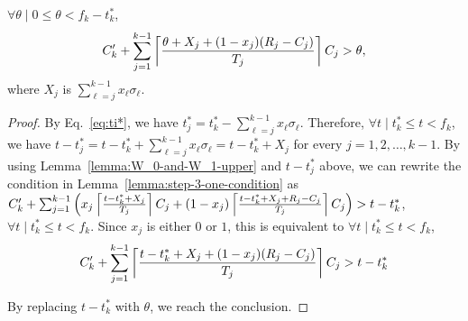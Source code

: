\begin{Lemma}
\label{lemma:step-3-ceiling-condition}
$\forall \theta \mid 0 \leq \theta < f_k-t_k^*$,
\begin{equation}
\label{eq:exec_plus_idle-almost-final-before-replacing-sigma} 
C_k'+\sum_{j=1}^{k-1} \ceiling{\frac{\theta+X_j+(1-x_j)(R_j-C_j)}{T_j}} C_j > \theta,
\end{equation}
where $X_j$ is $\sum_{\ell=j}^{k-1} x_\ell\sigma_\ell$. 
\end{Lemma}
\begin{proof}
  By Eq.~\eqref{eq:ti*}, we have $t_j^* = t_k^* - \sum_{\ell=j}^{k-1}
  x_\ell\sigma_\ell$. Therefore, $\forall t \mid t_k^* \leq t < f_k$,
  we have $t-t_j^* = t - t_k^* + \sum_{\ell=j}^{k-1}
  x_\ell\sigma_\ell = t-t_k^* + X_j$ for every $j=1,2,\ldots,k-1$. 
By using Lemma~\ref{lemma:W_0-and-W_1-upper} and $t-t_j^*$ above, we can rewrite the condition in Lemma~\ref{lemma:step-3-one-condition} as $C_k'+\sum_{j=1}^{k-1} \left(x_j\left\lceil{\frac{t-t_k^*+X_j}{T_j}}\right\rceil C_j  + (1-x_j) \left\lceil{\frac{t-t_k^*+X_j+R_j-C_j}{T_j}}\right\rceil C_j\right) > t-t_k^*$, $\forall t \mid t_k^* \leq t < f_k$.
Since $x_j$ is either $0$ or $1$, this is equivalent to  $\forall t \mid t_k^* \leq t < f_k$,
\begin{align*}
C_k'+\sum_{j=1}^{k-1} \left\lceil{\frac{t-t_k^*+X_j+(1-x_j)(R_j-C_j)}{T_j}}\right\rceil C_j > t-t_k^*
\end{align*}

  By replacing $t-t_k^*$ with $\theta$, we reach the conclusion.
\end{proof}


